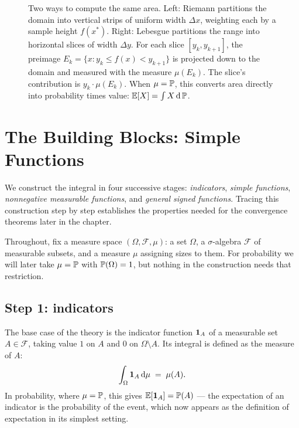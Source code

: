 \begin{figure}[H]
\caption{Two ways to compute the same area. Left: Riemann partitions the domain into vertical strips of uniform width $\Delta x$, weighting each by a sample height $f(x^*)$. Right: Lebesgue partitions the range into horizontal slices of width $\Delta y$. For each slice $[y_k, y_{k+1}]$, the preimage $E_k = \{x : y_k \le f(x) < y_{k+1}\}$ is projected down to the domain and measured with the measure $\mu(E_k)$. The slice's contribution is $y_k \cdot \mu(E_k)$. When $\mu = \P$, this converts area directly into probability times value: $\E[X] = \int X\,\dd\P$.}
\label{ch37:fig-two-cuts}
\end{figure}

\section{The Building Blocks: Simple Functions}
\label{ch37:simple}

We construct the integral in four successive stages:
\emph{indicators}, \emph{simple functions}, \emph{nonnegative
measurable functions}, and \emph{general signed functions}.
Tracing this construction step by step establishes the properties
needed for the convergence theorems later in the chapter.

Throughout, fix a measure space $(\Omega,\mathcal F,\mu)$: a set $\Omega$, a
$\sigma$-algebra $\mathcal F$ of measurable subsets, and a measure $\mu$
assigning sizes to them. For probability we will later take $\mu=\P$ with
$\P(\Omega)=1$, but nothing in the construction needs that restriction.

\subsection{Step 1: indicators}

The base case of the theory is the indicator function $\ind_A$ of a measurable set
$A\in\mathcal F$, taking value $1$ on $A$ and $0$ on $\Omega\setminus A$.
Its integral is defined as the measure of $A$:
\[
  \int_\Omega \ind_A \,\dd\mu \;=\; \mu(A).
\]
In probability, where $\mu=\P$, this gives $\E[\ind_A]=\P(A)$ --- the expectation of
an indicator is the probability of the event, which now appears as the definition of
expectation in its simplest setting.

